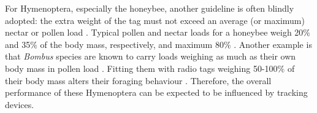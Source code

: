 \documentclass[10pt, twoside]{book} %
\begin{document}
	For Hymenoptera, especially the honeybee, another guideline is often blindly adopted: the extra weight of the tag must not exceed an average (or maximum) nectar or pollen load \citep[e.g. in][]{capaldi2000, reynolds2009}. Typical pollen and nectar loads for a honeybee weigh 20$\%$ and 35$\%$ of the body mass, respectively, and maximum 80$\%$ \citep{feuerbacher2003}. Another example is that \textit{Bombus} species are known to carry loads weighing as much as their own body mass in pollen load \citep{hagen2011}. Fitting them with radio tags weighing 50-100$\%$ of their body mass alters their foraging behaviour \citep{hagen2011}. Therefore, the overall performance of these Hymenoptera can be expected to be influenced by tracking devices.\\
	
	\clearpage	
	
\end{document}
